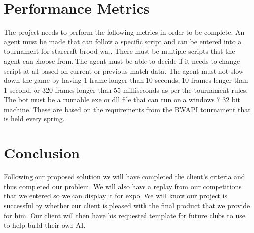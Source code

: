 \documentclass[10pt,letterpaper,onecolumn,draftclsnofoot]{IEEEtran}
\begin{document}
\section{Performance Metrics}
The project needs to perform the following metrics in order to be complete. An agent must be made that can follow a specific script and can be entered into a tournament for starcraft brood war. There must be multiple scripts that the agent can choose from. The agent must be able to decide if it needs to change script at all based on current or previous match data. The agent must not slow down the game by having 1 frame longer than 10 seconds, 10 frames longer than 1 second, or 320 frames longer than 55 milliseconds as per the tournament rules. The bot must be a runnable exe or dll file that can run on a windows 7 32 bit machine. These are based on the requirements from the BWAPI tournament that is held every spring.

\section{Conclusion}
Following our proposed solution we will have completed the client’s criteria and thus completed our problem. We will also have a replay from our competitions that we entered so we can display it for expo. We will know our project is successful by whether our client is pleased with the final product that we provide for him. Our client will then have his requested template for future clubs to use to help build their own AI.
\end{document}
